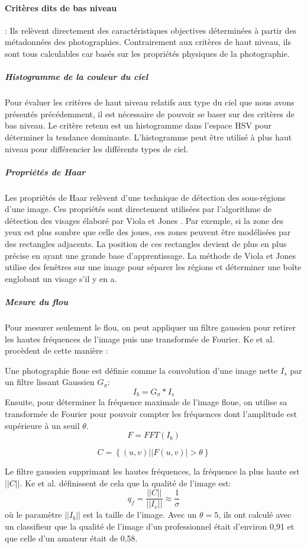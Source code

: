 \documentclass[11pt, french]{report-rd-info}
\begin{document}
\paragraph{Critères dits de bas niveau} : Ils relèvent directement des caractéristiques objectives déterminées à partir des métadonnées des photographies. Contrairement aux critères de haut niveau, ils sont tous calculables car basés sur les propriétés physiques de la photographie.
\subparagraph{Histogramme de la couleur du ciel}
Pour évaluer les critères de haut niveau relatifs aux type du ciel que nous avons présentés précédemment, il est nécessaire de pouvoir se baser sur des critères de bas niveau. Le critère retenu est un histogramme dans l’espace HSV pour déterminer la tendance dominante. L’histogramme peut être utilisé à plus haut niveau pour différencier les différents types de ciel.
\subparagraph{Propriétés de Haar}
Les propriétés de Haar relèvent d’une technique de détection des sous-régions d’une image. Ces propriétés sont directement utilisées par l’algorithme de détection des visages élaboré par Viola et Jones \cite{Viola2004}. Par exemple, si la zone des yeux est plus sombre que celle des joues, ces zones peuvent être modélisées par des rectangles adjacents. La position de ces rectangles devient de plus en plus précise en ayant une grande base d’apprentissage. La méthode de Viola et Jones utilise des fenêtres sur une image pour séparer les régions et déterminer une boîte englobant un visage s’il y en a.
\subparagraph{Mesure du flou}
Pour mesurer seulement le flou, on peut appliquer un filtre gaussien pour retirer les hautes fréquences de l’image puis une transformée de Fourier. Ke et al. \cite{Ke} procèdent de cette manière : 

Une photographie floue est définie comme la convolution d'une image nette $I_s$ par un filtre lissant Gaussien $G_\sigma$:
\begin{equation}
I_b = G_\sigma * I_s 
\end{equation}
Ensuite, pour déterminer la fréquence maximale de l'image floue, on utilise sa transformée de Fourier pour pouvoir compter les fréquences dont l'amplitude est supérieure à un seuil $\theta$.
\begin{equation}
F = FFT(I_b)
\end{equation}

\begin{equation}
C = \left\{(u,v) | |F(u,v)| > \theta\right\}
\end{equation}
 
Le filtre gaussien supprimant les hautes fréquences, la fréquence la plus haute est $||C||$. Ke et al. \cite{Ke} définissent de cela que la qualité de l'image est: 
\begin{equation}
q_f = \frac{||C||}{||I_v||} \approx \frac{1}{\sigma}
\end{equation}
où le paramètre $||I_b||$ est la taille de l'image. Avec un $\theta = 5$, ils ont calculé avec un classifieur que la qualité de l'image d'un professionnel était d'environ 0,91 et que celle d'un amateur était de 0,58.
\end{document}
